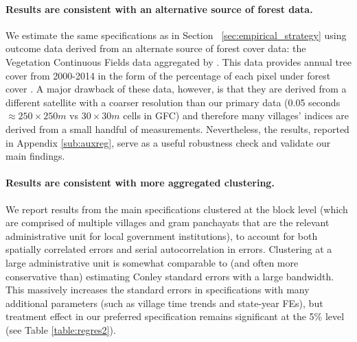 \documentclass[12pt,reqno]{article}
\begin{document}
\paragraph*{Results are consistent with an alternative source of forest data.} We estimate the same specifications as in Section ~\ref{sec:empirical_strategy} using outcome data derived from an alternate source of forest cover data: the Vegetation Continuous Fields data \parencite{Song2018-sw} aggregated by \textcite{almn2020}. This data provides annual tree cover from 2000-2014 in the form of the percentage of each pixel under forest cover \parencite{Sexton2013-xx}. A major drawback of these data, however, is that they are derived from a different satellite with a coarser resolution than our primary data (0.05 seconds $\approx 250\times250m$ vs $30\times30m$ cells in GFC) and therefore many villages' indices are derived from a small handful of measurements. Nevertheless, the results, reported in Appendix \ref{sub:auxreg}, serve as a useful robustness check and validate our main findings.

\paragraph*{Results are consistent with more aggregated clustering.}
We report results from the main specifications clustered at the block level (which are comprised of multiple villages and gram panchayats that are the relevant administrative unit for local government institutions), to account for both spatially correlated errors and serial autocorrelation in errors. Clustering at a large administrative unit is somewhat comparable to (and often more conservative than) estimating Conley standard errors with a large bandwidth. This massively increases the standard errors in specifications with many additional parameters (such as village time trends and state-year FEs), but treatment effect in our preferred specification remains significant at the 5\% level (see Table \ref{table:regres2}).
\end{document}
